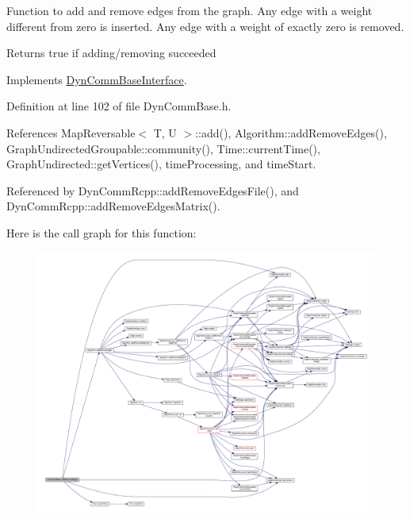 Function to add and remove edges from the graph. Any edge with a weight different from zero is inserted. Any edge with a weight of exactly zero is removed. \begin{DoxyReturn}{Returns}
true if adding/removing succeeded 
\end{DoxyReturn}


Implements \hyperlink{classDynCommBaseInterface_a08720be341a0e75c3535749219f7377b}{Dyn\+Comm\+Base\+Interface}.



Definition at line 102 of file Dyn\+Comm\+Base.\+h.



References Map\+Reversable$<$ T, U $>$\+::add(), Algorithm\+::add\+Remove\+Edges(), Graph\+Undirected\+Groupable\+::community(), Time\+::current\+Time(), Graph\+Undirected\+::get\+Vertices(), time\+Processing, and time\+Start.



Referenced by Dyn\+Comm\+Rcpp\+::add\+Remove\+Edges\+File(), and Dyn\+Comm\+Rcpp\+::add\+Remove\+Edges\+Matrix().

Here is the call graph for this function\+:
\nopagebreak
\begin{figure}[H]
\begin{center}
\leavevmode
\includegraphics[width=350pt]{classDynCommBase_a85ff9898ef25b12f3e80842c7b2696fe_cgraph}
\end{center}
\end{figure}
\mbox{\label{classDynCommBase_a064d9909a91cfe25acf05e6bd1fc967d}} 
